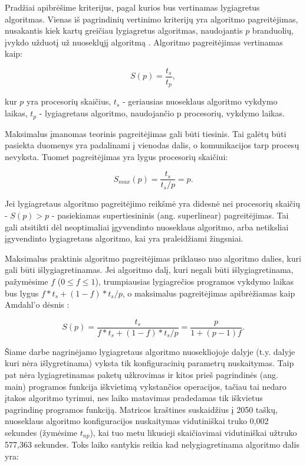\documentclass{VUMIFPSbakalaurinis}
\begin{document}
Pradžiai apibrėšime kriterijus, pagal kurios bus vertinamas lygiagretus algoritmas.
Vienas iš pagrindinių vertinimo kriterijų yra algoritmo pagreitėjimas, nusakantis kiek kartų greičiau lygiagretus algoritmas, naudojantis $p$ branduolių, įvykdo užduotį už nuoseklųjį algoritmą \cite{eager1989speedup}.   
Algoritmo pagreitėjimas vertinamas kaip:

\[ S(p) = \frac{t_s}{t_p} ,\]

kur $p$ yra procesorių skaičius, $t_s$ -  geriausias nuoseklaus algoritmo vykdymo laikas, $t_p$ - lygiagretaus algoritmo, naudojančio p procesorių, vykdymo laikas. 

Maksimalus įmanomas teorinis pagreitėjimas gali būti tiesinis. 
Tai galėtų būti pasiekta duomenys yra padalinami į vienodas dalis, o komunikacijos tarp procesų nevyksta.
Tuomet pagreitėjimas yra lygus procesorių skaičiui:

\[ S_{max}(p) = \frac{t_s}{t_s/p} = p .\]

Jei lygiagretaus algoritmo pagreitėjimo reikšmė yra didesnė nei procesorių skaičių - $S(p) > p$ - pasiekiamas supertiesininis (ang. superlinear) pagreitėjimas. 
Tai gali atsitikti dėl neoptimaliai įgyvendinto nuoseklaus algoritmo, arba netiksliai įgyvendinto lygiagretaus algoritmo, kai yra praleidžiami žingsniai.

Maksimalus praktinis algoritmo pagreitėjimas priklauso nuo algoritmo dalies, kuri gali būti išlygiagretinamas. 
Jei algoritmo dalį, kuri negali būti išlygiagretinama, pažymėsime $f$ ($0 \le f \le 1$), trumpiausias lygiagrečios programos vykdymo laikas bus lygus $f*t_s+ (1-f)*t_s/p$, o maksimalus pagreitėjimas apibrėžiamas kaip Amdahl'o dėsnis \cite{amdahl1967validity}:



\[ S(p) = \frac{t_s}{f*t_s+ (1-f)*t_s/p} = \frac{p}{1+(p-1)f} .\]


Šiame darbe nagrinėjamo lygiagretaus algoritmo nuosekliojoje dalyje (t.y. dalyje kuri nėra išlygretinama) vyksta tik konfiguracinių parametrų nuskaitymas. 
Taip pat nėra lygiagretinamas paketų užkrovimas ir kitos prieš pagrindinės (ang. main) programos funkcija iškvietimą vykstančios operacijos, tačiau tai nedaro įtakos algoritmo tyrimui, nes laiko matavimas pradedamas tik iškvietus pagrindinę programos funkciją.
Matricos kraštines suskaidžius į 2050 taškų, nuoseklaus algoritmo konfiguracijos nuskaitymas vidutiniškai truko 0,002 sekundes (žymėsime $t_{np}$), kai tuo metu likusieji skaičiavimai vidutiniškai užtruko 577,363 sekundes.
Toks laiko santykis reikia kad nelygiagretinama algoritmo dalis yra:
\end{document}
